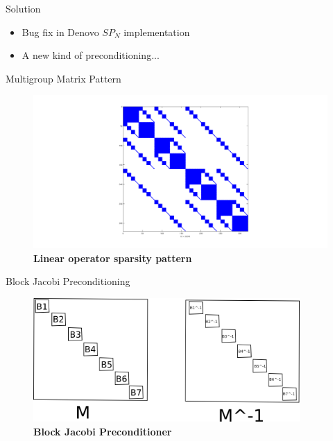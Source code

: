 \documentclass{beamer}
\begin{document}
\begin{frame}{Solution}

  \begin{itemize}
  \item Bug fix in Denovo $SP_N$ implementation
  \item A new kind of preconditioning...
  \end{itemize}

\end{frame}

\begin{frame}{Multigroup Matrix Pattern}

  \begin{figure}[h!]
    \centering
    \includegraphics[width=5in,clip]{upscatter.png}
    \caption{\textbf{Linear operator sparsity pattern}}
  \end{figure}

\end{frame}

\begin{frame}{Block Jacobi Preconditioning}

  \begin{figure}[h!]
    \centering
    \includegraphics[width=4in,clip]{block_preconditioning.png}
    \caption{\textbf{Block Jacobi Preconditioner}}
  \end{figure}

\end{frame}
\end{document}
